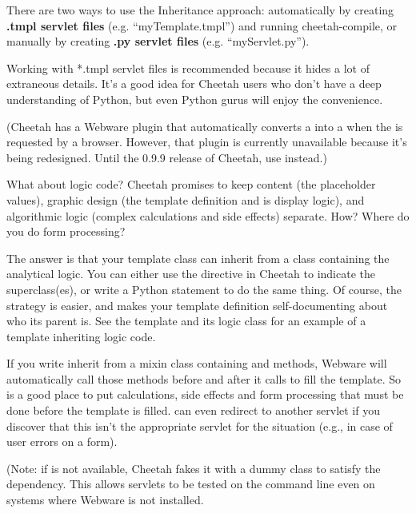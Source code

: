 There are two ways to use the Inheritance approach: automatically by creating
{\bf *.tmpl servlet files} (e.g. ``myTemplate.tmpl'') and running
cheetah-compile, or manually by creating {\bf .py servlet files} (e.g.
``myServlet.py'').

Working with *.tmpl servlet files is recommended because it hides a lot of
extraneous details.  It's a good idea for Cheetah users who don't have a deep
understanding of Python, but even Python gurus will enjoy the convenience.

(Cheetah has a Webware plugin that automatically converts a  into a  when the  is
requested by a browser.  However, that plugin is currently unavailable because
it's being redesigned.  Until the 0.9.9 release of Cheetah, use
 instead.)

What about logic code?  Cheetah promises to keep content (the placeholder
values), graphic design (the template definition and is display logic), and
algorithmic logic (complex calculations and side effects) separate.  How?
Where do you do form processing?

The answer is that your template class can inherit from a class containing
the analytical logic.  You can either use the  directive in
Cheetah to indicate the superclass(es), or write a Python 
statement to do the same thing.  Of course, the  strategy is
easier, and makes your template definition self-documenting about who its
parent is.  See the template  and its
logic class  for an example of 
a template inheriting logic code.

If you write inherit from a mixin class containing  and 
 methods, Webware will automatically call those methods before
and after it calls  to fill the template.  So 
 is a good place to put calculations, side effects and 
form processing that must be done before the template is filled.
 can even redirect to another servlet if you discover that this
isn't the appropriate servlet for the situation (e.g., in case of user errors
on a form).  

(Note: if  is not available, Cheetah fakes it with a
dummy class to satisfy the dependency.  This allows servlets to be tested on
the command line even on systems where Webware is not installed.

